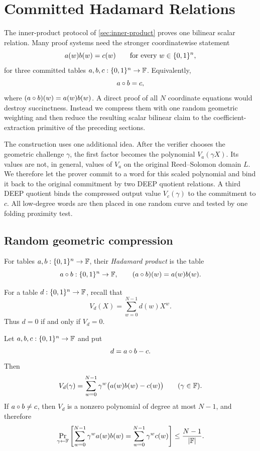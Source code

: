 \section{Committed Hadamard Relations}
\label{sec:hadamard}

The inner-product protocol of \cref{sec:inner-product} proves one bilinear scalar relation.  Many proof systems need the stronger coordinatewise statement
\[
  a(w)b(w)=c(w)
  \qquad\text{for every }w\in\{0,1\}^n,
\]
for three committed tables $a,b,c:\{0,1\}^n\to\mathbb{F}$.  Equivalently,
\[
  a\circ b=c,
\]
where $(a\circ b)(w)=a(w)b(w)$.  A direct proof of all $N$ coordinate equations would destroy succinctness.  Instead we compress them with one random geometric weighting and then reduce the resulting scalar bilinear claim to the coefficient-extraction primitive of the preceding sections.

The construction uses one additional idea.  After the verifier chooses the geometric challenge $\gamma$, the first factor becomes the polynomial $V_a(\gamma X)$.  Its values are not, in general, values of $V_a$ on the original Reed--Solomon domain $L$.  We therefore let the prover commit to a word for this scaled polynomial and bind it back to the original commitment by two DEEP quotient relations.  A third DEEP quotient binds the compressed output value $V_c(\gamma)$ to the commitment to $c$.  All low-degree words are then placed in one random curve and tested by one folding proximity test.

\subsection{Random geometric compression}
\label{sec:hadamard-geometric-compression}

\begin{definition}
\label{def:hadamard-product}
For tables $a,b:\{0,1\}^n\to\mathbb{F}$, their \emph{Hadamard product} is the table
\[
  a\circ b:\{0,1\}^n\to\mathbb{F},
  \qquad
  (a\circ b)(w)=a(w)b(w).
\]
\end{definition}

For a table $d:\{0,1\}^n\to\mathbb{F}$, recall that
\[
  V_d(X)=\sum_{w=0}^{N-1}d(w)X^w.
\]
Thus $d=0$ if and only if $V_d=0$.

\begin{lemma}
\label{lem:hadamard-geometric-fingerprint}
Let $a,b,c:\{0,1\}^n\to\mathbb{F}$ and put
\[
  d=a\circ b-c.
\]
Then
\begin{equation}
  V_d(\gamma)
  =\sum_{w=0}^{N-1}\gamma^w\bigl(a(w)b(w)-c(w)\bigr)
  \qquad(\gamma\in\mathbb{F}).
  \label{eq:hadamard-fingerprint}
\end{equation}
If $a\circ b\ne c$, then $V_d$ is a nonzero polynomial of degree at most $N-1$, and therefore
\begin{equation}
  \Pr_{\gamma\leftarrow\mathbb{F}}
  \left[
    \sum_{w=0}^{N-1}\gamma^wa(w)b(w)
    =\sum_{w=0}^{N-1}\gamma^wc(w)
  \right]
  \le \frac{N-1}{|\mathbb{F}|}.
  \label{eq:hadamard-fingerprint-bound}
\end{equation}
\end{lemma}

